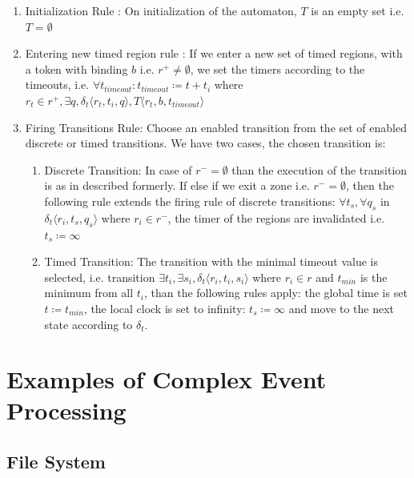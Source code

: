 				\begin{enumerate}
					\item Initialization Rule : On initialization of the automaton, $T$ is an empty set
					i.e. $T = \emptyset$
				
					\item Entering new timed region rule :
					If we enter a new set of timed regions, with a token with binding $b$ 
					i.e. $r^+ \neq \emptyset$, 
					we set the timers according to the timeouts, 
					i.e. $\forall t_{timeout} : t_{timeout} \coloneqq t + t_i $ where $ r_t \in r^+, \exists q ,\delta_t\langle  r_t,t_i,q \rangle, T \langle r_t,b, t_{timeout} \rangle$
					
					\item Firing Transitions Rule: Choose an enabled transition from the set of enabled discrete or timed transitions. 
					We have two cases, the chosen transition is:
						\begin{enumerate}
							\item Discrete Transition: In case of $r^- = \emptyset$ than the execution of the transition is as in described formerly. 
								If else if we exit a zone i.e. $r^- = \emptyset$, 
								then the following rule extends the firing rule of discrete transitions:
								$\forall t_s, \forall q_s$ in $ \delta_t \langle r_i, t_s, q_s \rangle$ where $r_i \in r^-$, the timer of the regions are invalidated i.e.
								$t_s \coloneqq \infty$
							\item Timed Transition: The transition with the minimal timeout value is selected, 
								 i.e. transition $\exists t_i, \exists s_i, \delta_t \langle r_i, t_i, s_i \rangle$ where $ r_i \in r$ and $t_{min}$ is the minimum from all $t_i$,
								 than the following rules apply:
								 the global time is set $t \coloneqq t_{min}$, 
								 the local clock is set to infinity: $t_s \coloneqq \infty$ 
								 and move to the next state according to $\delta_t$.
						\end{enumerate}			
				\end{enumerate}

			
	\section{Examples of Complex Event Processing}
 
 
		\subsection{File System}
